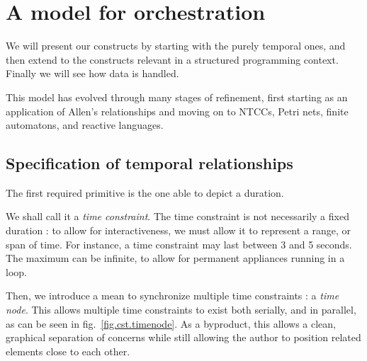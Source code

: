 \documentclass{sigchi}
\begin{document}
\section{A model for orchestration}
We will present our constructs by starting with the purely temporal ones, 
and then extend to the constructs relevant in a structured programming context.
Finally we will see how data is handled.

This model has evolved through many stages of refinement, first starting as an application of 
Allen's relationships and moving on to NTCCs, Petri nets, finite automatons, and reactive languages.

\subsection{Specification of temporal relationships}\label{sec.temporal}
The first required primitive is the one able to depict a duration.

We shall call it a \textit{time constraint}.
The time constraint is not necessarily a fixed duration : to allow for interactiveness, 
we must allow it to represent a range, or span of time. For instance, a time constraint may last between 3 and 5 seconds. The maximum can be infinite, to allow for permanent appliances running in a loop.

Then, we introduce a mean to synchronize multiple time constraints : a \textit{time node}. 
This allows multiple time constraints to exist both serially, and in parallel, as can be seen in fig.~\ref{fig.cst.timenode}. 
As a byproduct, this allows a clean, graphical separation of concerns while still allowing the author to position related elements close to each other. %
\end{document}
